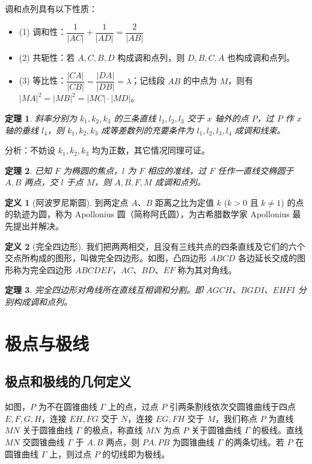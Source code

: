\documentclass[UTF8,12pt]{ctexart}
\theoremstyle{plain} %
\newtheorem{theorem}{定理}[section]
\theoremstyle{definition} %
\newtheorem{definition}{定义}[section]
\theoremstyle{remark} %
\begin{document}
调和点列具有以下性质：
\begin{itemize}
\item (1) 调和性：$\dfrac{1}{|AC|} + \dfrac{1}{|AD|} = \dfrac{2}{|AB|}$
\item (2) 共轭性：若 $A,C,B,D$ 构成调和点列，则 $D,B,C,A$ 也构成调和点列。
\item (3) 等比性：$\dfrac{|CA|}{|CB|} = \dfrac{|DA|}{|DB|} = \lambda$；记线段 $AB$ 的中点为 $M$，则有 $|MA|^2 = |MB|^2 = |MC| \cdot |MD|$。
\end{itemize}

\begin{theorem}
斜率分别为 $k_1, k_2, k_3$ 的三条直线 $l_1, l_2, l_3$ 交于 $x$ 轴外的点 $P$，过 $P$ 作 $x$ 轴的垂线 $l_4$，则 $k_1, k_2, k_3$ 成等差数列的充要条件为 $l_1, l_2, l_3, l_4$ 成调和线束。
\end{theorem}
分析：不妨设 $k_1, k_2, k_3$ 均为正数，其它情况同理可证。

\begin{theorem}
已知 $F$ 为椭圆的焦点，$l$ 为 $F$ 相应的准线，过 $F$ 任作一直线交椭圆于 $A, B$ 两点，交 $l$ 于点 $M$，则 $A, B, F, M$ 成调和点列。
\end{theorem}

\begin{definition}[阿波罗尼斯圆]
到两定点 $A$、$B$ 距离之比为定值 $k$ ($k>0$ 且 $k \neq 1$) 的点的轨迹为圆，称为 Apollonius 圆（简称阿氏圆），为古希腊数学家 Apollonius 最先提出并解决。
\end{definition}

\begin{definition}[完全四边形]
我们把两两相交，且没有三线共点的四条直线及它们的六个交点所构成的图形，叫做完全四边形。如图，凸四边形 $ABCD$ 各边延长交成的图形称为完全四边形 $ABCDEF$，$AC$、$BD$、$EF$ 称为其对角线。
\end{definition}

\begin{theorem}
完全四边形对角线所在直线互相调和分割。即 $AGCH$、$BGDI$、$EHFI$ 分别构成调和点列。
\end{theorem}

\section{极点与极线}
\subsection{极点和极线的几何定义}
如图，$P$ 为不在圆锥曲线 $\Gamma$ 上的点，过点 $P$ 引两条割线依次交圆锥曲线于四点 $E,F,G,H$，连接 $EH,FG$ 交于 $N$，连接 $EG,FH$ 交于 $M$，我们称点 $P$ 为直线 $MN$ 关于圆锥曲线 $\Gamma$ 的极点，称直线 $MN$ 为点 $P$ 关于圆锥曲线 $\Gamma$ 的极线。直线 $MN$ 交圆锥曲线 $\Gamma$ 于 $A,B$ 两点，则 $PA,PB$ 为圆锥曲线 $\Gamma$ 的两条切线。若 $P$ 在圆锥曲线 $\Gamma$ 上，则过点 $P$ 的切线即为极线。
\end{document}
